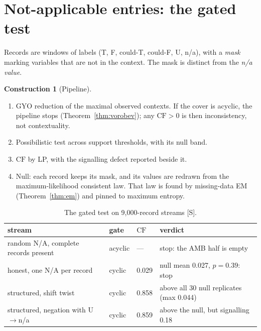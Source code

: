 \documentclass[11pt]{article}
\theoremstyle{definition}
\newtheorem{construction}[theorem]{Construction}
\theoremstyle{remark}
\newcommand{\CF}{\mathrm{CF}}
\newcommand{\src}[1]{\textsf{\small[#1]}}
\begin{document}
\section{Not-applicable entries: the gated test}\label{sec:na}
Records are windows of labels (T, F, could-T, could-F, U, n/a), with a \emph{mask} marking variables that are not in the context. The mask is distinct from the \emph{n/a value}.

\begin{construction}[Pipeline]
\begin{enumerate}
  \item GYO reduction of the maximal observed contexts. If the cover is acyclic, the pipeline stops (Theorem~\ref{thm:vorobev}); any $\CF>0$ is then inconsistency, not contextuality.
  \item Possibilistic test across support thresholds, with its null band.
  \item $\CF$ by LP, with the signalling defect reported beside it.
  \item Null: each record keeps its mask, and its values are redrawn from the maximum-likelihood consistent law. That law is found by missing-data EM (Theorem~\ref{thm:em}) and pinned to maximum entropy.
\end{enumerate}
\end{construction}
\begin{table}[!htbp]\centering\small
\begin{tabular}{llll}
\toprule
stream & gate & $\CF$ & verdict\\
\midrule
random N/A, complete records present & acyclic & --- & stop: the AMB half is empty\\
honest, one N/A per record & cyclic & 0.029 & null mean 0.027, $p=0.39$: stop\\
structured, shift twist & cyclic & 0.858 & above all 30 null replicates (max 0.044)\\
structured, negation with U$\to$n/a & cyclic & 0.859 & above the null, but signalling 0.18\\
\bottomrule
\end{tabular}
\caption{The gated test on 9{,}000-record streams \src{S}.}
\end{table}
\end{document}
